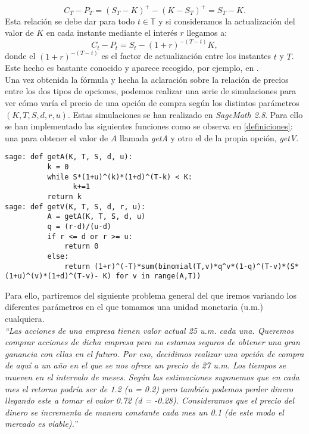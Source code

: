 \[
C_T - P_T = (S_T - K)^+ - (K-S_T)^+ = S_T - K.
\]
Esta relación se debe dar para todo $ t \in \mathbb{T} $ y si consideramos la actualización del valor de $ K $ en cada instante mediante el interés $ r $ llegamos a:
\[
C_t - P_t = S_t - (1+r)^{-(T-t)}K,
\]
donde el $ (1+r)^{-(T-t)} $ es el factor de actualización entre los instantes $ t $ y $ T $. Este hecho es bastante conocido y aparece recogido, por ejemplo, en \cite{elliot1999mathematics}.\\

Una vez obtenida la fórmula y hecha la aclaración sobre la relación de precios entre los dos tipos de opciones, podemos realizar una serie de simulaciones para ver cómo varía el precio de una opción de compra según los distintos parámetros $ (K, T, S, d, r, u) $. Estas simulaciones se han realizado en  \textit{SageMath 2.8}. Para ello se han implementado las siguientes funciones como se observa en \ref{definiciones}: una para obtener el valor de $ A $ llamada \textit{getA} y otro el de la propia opción, \textit{getV}.

\begin{lstlisting}[label={definiciones}, caption={Definición en Sage de las funciones}, morekeywords={sage}]
sage: def getA(K, T, S, d, u):
          k = 0
          while S*(1+u)^(k)*(1+d)^(T-k) < K:
                k+=1
          return k
sage: def getV(K, T, S, d, r, u):
          A = getA(K, T, S, d, u)
          q = (r-d)/(u-d)
          if r <= d or r >= u:
              return 0
          else:
              return (1+r)^(-T)*sum(binomial(T,v)*q^v*(1-q)^(T-v)*(S*(1+u)^(v)*(1+d)^(T-v)- K) for v in range(A,T))           	 
\end{lstlisting}

Para ello, partiremos del siguiente problema general del que iremos variando los diferentes parámetros en el que tomamos una unidad monetaria (u.m.) cualquiera. \\

\textit{``Las acciones de una empresa tienen valor actual 25 u.m. cada una. Queremos comprar acciones de dicha empresa pero no estamos seguros de obtener una gran ganancia con ellas en el futuro. Por eso, decidimos realizar una opción de compra de aquí a un año en el que se nos ofrece un precio de 27 u.m. Los tiempos se mueven en el intervalo de meses. Según las estimaciones suponemos que en cada mes el retorno podría ser de 1.2 (u = 0.2)  pero también podemos perder dinero llegando este a tomar el valor 0.72 (d = -0.28). Consideramos que el precio del dinero se incrementa de manera constante cada mes un 0.1 (de este modo el mercado es viable).''} \\

